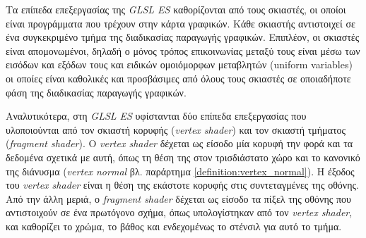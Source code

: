 Tα επίπεδα επεξεργασίας της \textsl{GLSL ES} καθορίζονται από τους σκιαστές, οι οποίοι είναι προγράμματα που τρέχουν στην κάρτα γραφικών. Κάθε σκιαστής αντιστοιχεί σε ένα συγκεκριμένο τμήμα της διαδικασίας παραγωγής γραφικών. Επιπλέον, οι σκιαστές είναι απομονωμένοι, δηλαδή ο μόνος τρόπος επικοινωνίας μεταξύ τους είναι μέσω των εισόδων και εξόδων τους και ειδικών ομοιόμορφων μεταβλητών (uniform variables) οι οποίες είναι καθολικές και προσβάσιμες από όλους τους σκιαστές σε οποιαδήποτε φάση της διαδικασίας παραγωγής γραφικών. 

Αναλυτικότερα, στη \textsl{GLSL ES} υφίστανται δύο επίπεδα επεξεργασίας που υλοποιούνται από τον σκιαστή κορυφής (\textsl{vertex shader}) και τον σκιαστή τμήματος (\textsl{fragment shader}). 
Ο \textsl{vertex shader} δέχεται ως είσοδο μία κορυφή την φορά και τα δεδομένα σχετικά με αυτή, όπως τη θέση της στον τρισδιάστατο χώρο και το κανονικό της διάνυσμα (\textsl{vertex normal} βλ. παράρτημα \ref{definition:vertex_normal}). Η έξοδος του \textsl{vertex shader} είναι η θέση της εκάστοτε κορυφής στις συντεταγμένες της οθόνης. Από την άλλη μεριά, ο \textsl{fragment shader} δέχεται ως είσοδο τα πίξελ της οθόνης που αντιστοιχούν σε ένα πρωτόγονο σχήμα, όπως υπολογίστηκαν από τον \textsl{vertex shader}, και καθορίζει το χρώμα, το βάθος και ενδεχομένως το στένσιλ για αυτό το τμήμα.